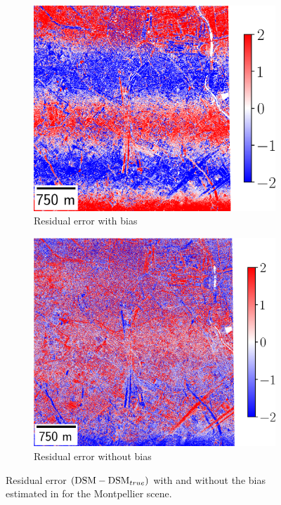 \begin{figure}
    \begin{subfigure}[t]{0.48\linewidth}
        \flushleft
        \includegraphics[width=\linewidth]{Images/Chap_6/vibrations_Montpellier.png}
        \caption{Residual error with bias}
        \label{fig:vibrations_Montpellier_with_bias}
    \end{subfigure}\hfill
    \begin{subfigure}[t]{0.48\linewidth}
        \flushright
        \includegraphics[width=\linewidth]{Images/Chap_6/vibration_corrected_Montpellier.png}
        \caption{Residual error without bias}
        \label{fig:vibrations_Montpellier_without_bias}
    \end{subfigure}
    \caption{Residual error $(\mathrm{DSM}-\mathrm{DSM}_{true})$ with and without the bias estimated in  for the Montpellier scene.}
    \label{fig:removed_bias_Montpellier}
\end{figure}

